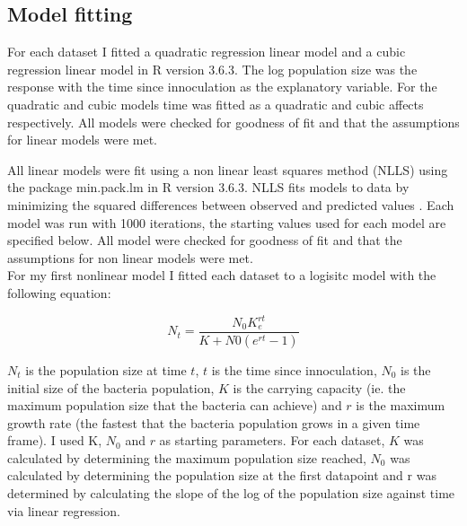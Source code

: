 \documentclass[titlepage]{article}
\newcommand{\subtitle}[1]{%
  \posttitle{%
    \par\end{center}
    \begin{center}\large#1\end{center}
    \vskip0.5em}%
}
\begin{document}
  \subsection{Model fitting}
  
 \subtitle{Linear models}

  For each dataset I fitted a quadratic regression linear model and a cubic regression linear model in R version 3.6.3. The log population size was the response with the time since innoculation as the explanatory variable. For the quadratic and cubic models time was fitted as a quadratic and cubic affects respectively. All models were checked for goodness of fit and that the assumptions for linear models were met.
  
  
\subtitle{non Linear models}

  
All linear models were fit using a non linear least squares method (NLLS) using the package min.pack.lm \cite{elzhov2016package} in R version 3.6.3. NLLS fits models to data by minimizing the squared differences between observed and predicted values \cite{johnson2004model}. Each model was run with 1000 iterations, the starting values used for each model are specified below. All model were checked for goodness of fit and that the assumptions for non linear models were met. \\

  
  
For my first nonlinear model I fitted each dataset to a logisitc model \cite{verhulst1838notice} with the following equation:

  \begin{equation}
    N_{t} =\frac{N_{0}K_{e}^{rt}}{K + N0(e^{rt}-1)} 
  \end{equation}
  
\(N_{t}\) is the population size at time \(t\), \(t\) is the time since innoculation, \(N_{0}\) is the initial size of the bacteria population, \(K\) is the carrying capacity (ie. the maximum population size that the bacteria can achieve) and \(r\) is the maximum growth rate (the fastest that the bacteria population grows in a given time frame). I used  K, \(N_{0}\) and \(r\) as starting parameters. For each dataset, \(K\) was calculated by determining the maximum population size reached, \(N_{0}\) was calculated by determining the population size at the first datapoint and r was determined by calculating the slope of the log of the population size against time via linear regression. \\
\end{document}
